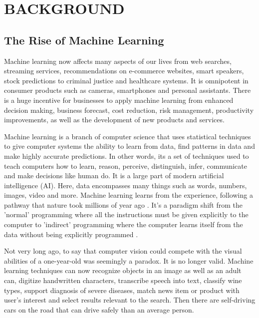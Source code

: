 
\chapter{BACKGROUND}

\graphicspath{ {./background/} }
\thispagestyle{empty}


\section{The Rise of Machine Learning}

Machine learning now affects many aspects of our lives from web searches, streaming services, recommendations on e-commerce websites, smart speakers, stock predictions to criminal justice and healthcare systems. It is omnipotent in consumer products such as cameras, smartphones and personal assistants. There is a huge incentive for businesses to apply machine learning from enhanced decision making, business forecast, cost reduction, risk management, productivity improvements, as well as the development of new products and services.

Machine learning is a branch of computer science that uses statistical techniques to give computer systems the ability to learn from data, find patterns in data and make highly accurate predictions. In other words, its a set of techniques used to teach computers how to learn, reason, perceive, distinguish, infer, communicate and make decisions like human do. It is a large part of modern artificial intelligence (AI). Here, data encompasses many things such as words, numbers, images, video and more. Machine learning learns from the experience, following a pathway that nature took millions of year ago \cite{sammut2011encyclopedia}. It's a paradigm shift from the 'normal' programming where all the instructions must be given explicitly to the computer to 'indirect' programming where the computer learns itself from the data without being explicitly programmed .

Not very long ago, to say that computer vision could compete with the visual abilities of a one-year-old was seemingly a paradox\cite{sejnowski2018deep}. It is no longer valid. Machine learning techniques can now recognize objects in an image as well as an adult can, digitize handwritten characters, transcribe speech into text, classify wine types, support diagnosis of severe diseases, match news item or product with user's interest and select results relevant to the search. Then there are self-driving cars \cite{sejnowski2018deep} on the road that can drive safely than an average person. 

